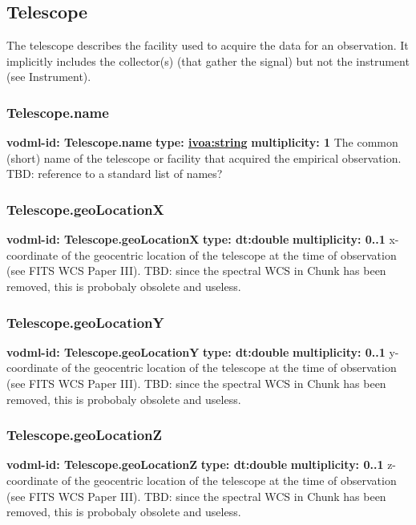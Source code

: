   \subsection{Telescope}
  \label{sect:Telescope}
    The telescope describes the facility used to acquire the data for an observation. It implicitly includes the collector(s) (that gather the signal) but not the instrument (see Instrument).

    \subsubsection{Telescope.name}
      \textbf{vodml-id: Telescope.name} \newline
      \textbf{type: \hyperref[sect:ivoa]{ivoa:string}} \newline
      \textbf{multiplicity: 1} \newline
      The common (short) name of the telescope or facility that acquired the empirical observation. TBD: reference to a standard list of names?

    \subsubsection{Telescope.geoLocationX}
      \textbf{vodml-id: Telescope.geoLocationX} \newline
      \textbf{type: dt:double} \newline
      \textbf{multiplicity: 0..1} \newline
      x-coordinate of the geocentric location of the telescope at the time of observation (see FITS WCS Paper III). TBD: since the spectral WCS in Chunk has been removed, this is probobaly obsolete and useless.

    \subsubsection{Telescope.geoLocationY}
      \textbf{vodml-id: Telescope.geoLocationY} \newline
      \textbf{type: dt:double} \newline
      \textbf{multiplicity: 0..1} \newline
      y-coordinate of the geocentric location of the telescope at the time of observation (see FITS WCS Paper III). TBD: since the spectral WCS in Chunk has been removed, this is probobaly obsolete and useless.

    \subsubsection{Telescope.geoLocationZ}
      \textbf{vodml-id: Telescope.geoLocationZ} \newline
      \textbf{type: dt:double} \newline
      \textbf{multiplicity: 0..1} \newline
      z-coordinate of the geocentric location of the telescope at the time of observation (see FITS WCS Paper III). TBD: since the spectral WCS in Chunk has been removed, this is probobaly obsolete and useless.

